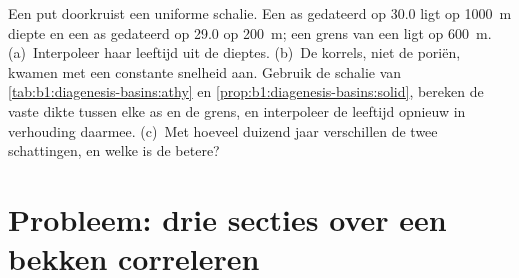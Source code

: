 \begin{exercise}[$\star\star\star$]\label{exo:b1:stratigraphic-scale:12}
Een put doorkruist een uniforme schalie. Een as gedateerd op \qty{30.0}{\Ma} ligt op \qty{1000}{m} diepte en een as gedateerd op \qty{29.0}{\Ma} op \qty{200}{m}; een grens van een  ligt op \qty{600}{m}. (a)~Interpoleer haar leeftijd uit de dieptes. (b)~De korrels, niet de poriën, kwamen met een constante snelheid aan. Gebruik de schalie van \cref{tab:b1:diagenesis-basins:athy} en \cref{prop:b1:diagenesis-basins:solid}, bereken de vaste dikte tussen elke as en de grens, en interpoleer de leeftijd opnieuw in verhouding daarmee. (c)~Met hoeveel duizend jaar verschillen de twee schattingen, en welke is de betere?
\end{exercise}

\section{Probleem: drie secties over een bekken correleren}

